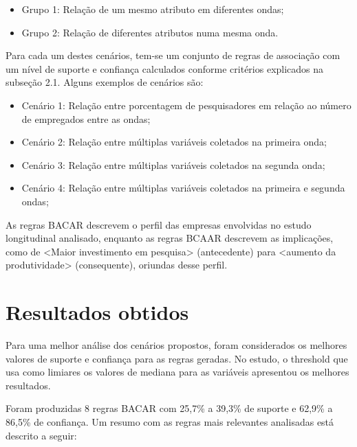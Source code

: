 \documentclass[12pt]{article}
\begin{document}
\begin{itemize}
    \item Grupo 1: Relação de um mesmo atributo em diferentes ondas;
    \item Grupo 2: Relação de diferentes atributos numa mesma onda.
\end{itemize}

Para cada um destes cenários, tem-se um conjunto de regras de associação com um nível de suporte e confiança calculados conforme critérios explicados na subseção 2.1. Alguns exemplos de cenários são:

\begin{itemize}
    \item Cenário 1: Relação entre porcentagem de pesquisadores em relação ao número de empregados entre as ondas;
    \item Cenário 2: Relação entre múltiplas variáveis coletados na primeira onda;
    \item Cenário 3: Relação entre múltiplas variáveis coletados na segunda onda;
    \item Cenário 4: Relação entre múltiplas variáveis coletados na primeira e segunda ondas;
\end{itemize}

As regras BACAR descrevem o perfil das empresas envolvidas no estudo longitudinal analisado, enquanto as regras BCAAR descrevem as implicações, como de <Maior investimento em pesquisa> (antecedente) para <aumento da produtividade> (consequente), oriundas desse perfil.

\section{Resultados obtidos}

Para uma melhor análise dos cenários propostos, foram considerados os melhores valores de suporte e confiança para as regras geradas. No estudo, o threshold que usa como limiares os valores de mediana para as variáveis apresentou os melhores resultados.

Foram produzidas 8 regras BACAR com 25,7\% a 39,3\% de suporte e 62,9\% a 86,5\% de confiança. Um resumo com as regras mais relevantes analisadas está descrito a seguir:
\end{document}
